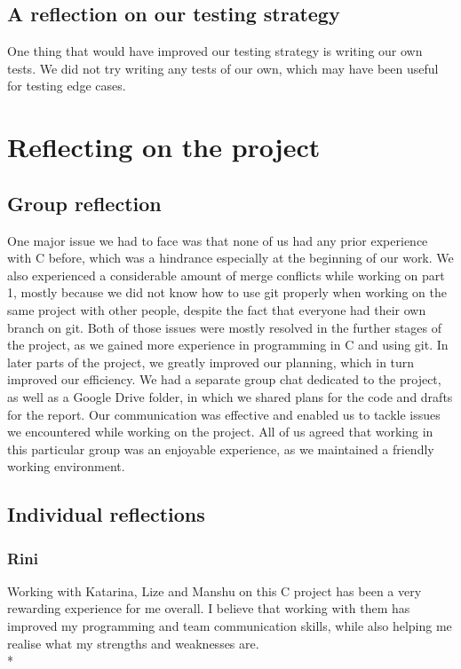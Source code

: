 \documentclass[letterpaper,11pt]{article}
\begin{document}
    \subsection{A reflection on our testing strategy}
    One thing that would have improved our testing strategy is writing our own tests. We did not try writing any tests of our own, which may have been useful for testing edge cases.

    \section{Reflecting on the project}
    \subsection{Group reflection}
    One major issue we had to face was that none of us had any prior experience with C before, which was a hindrance especially at the beginning of our work. We also experienced a considerable amount of merge conflicts while working on part 1, mostly because we did not know how to use git properly when working on the same project with other people, despite the fact that everyone had their own branch on git. Both of those issues were mostly resolved in the further stages of the project, as we gained more experience in programming in C and using git. In later parts of the project, we greatly improved our planning, which in turn improved our efficiency. We had a separate group chat dedicated to the project, as well as a Google Drive folder, in which we shared plans for the code and drafts for the report. Our communication was effective and enabled us to tackle issues we encountered while working on the project. All of us agreed that working in this particular group was an enjoyable experience, as we maintained a friendly working environment.

    \subsection{Individual reflections}
    \subsubsection{Rini}
    Working with Katarina, Lize and Manshu on this C project has been a very rewarding experience for me overall. I believe that working with them has improved my programming and team communication skills, while also helping me realise what my strengths and weaknesses are.\\*
\end{document}

